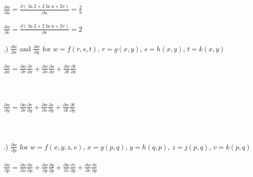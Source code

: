 \documentclass[12pt]{article}
\begin{document}
\noindent $\frac{\partial w}{\partial u} = \frac{\partial (\ln{2} + 2\ln{u} + 2v)}{\partial u} = \frac{2}{u}$\\\\

\noindent $\frac{\partial w}{\partial v} = \frac{\partial (\ln{2} + 2\ln{u} + 2v)}{\partial v} = 2$\\\\


.) $\frac{\partial w}{\partial x}$ and $\frac{\partial w}{\partial y}$ for $w = f(r,s,t)$, \hspace{10pt} $r = g(x,y)$, \hspace{10pt} $s = h(x,y)$, \hspace{10pt} $t = k(x,y)$\\\\

\noindent $\frac{\partial w}{\partial x} = \frac{\partial w}{\partial r}\frac{\partial r}{\partial x} + \frac{\partial w}{\partial s}\frac{\partial s}{\partial x} + \frac{\partial w}{\partial t}\frac{\partial t}{\partial x}$ \\\\
\vspace{6cm}\\\\




\noindent $\frac{\partial w}{\partial y} = \frac{\partial w}{\partial r}\frac{\partial r}{\partial y} + \frac{\partial w}{\partial s}\frac{\partial s}{\partial y} + \frac{\partial w}{\partial t}\frac{\partial t}{\partial y}$ \\\\
\vspace{6cm}\\\\



.) $\frac{\partial w}{\partial p}$ for $w = f(x,y,z,v)$, \hspace{10pt} $x = g(p,q)$, \hspace{10pt} $y = h(q,p)$, \hspace{10pt} $z = j(p,q)$, \hspace{10pt} $v = k(p,q)$\\\\
\noindent $\frac{\partial w}{\partial p} = \frac{\partial w}{\partial x}\frac{\partial x}{\partial p} + \frac{\partial w}{\partial y}\frac{\partial y}{\partial p} + \frac{\partial w}{\partial z}\frac{\partial z}{\partial p} + \frac{\partial w}{\partial v}\frac{\partial v}{\partial p}$\\\\
\vspace{6cm}\\\\
\end{document}
